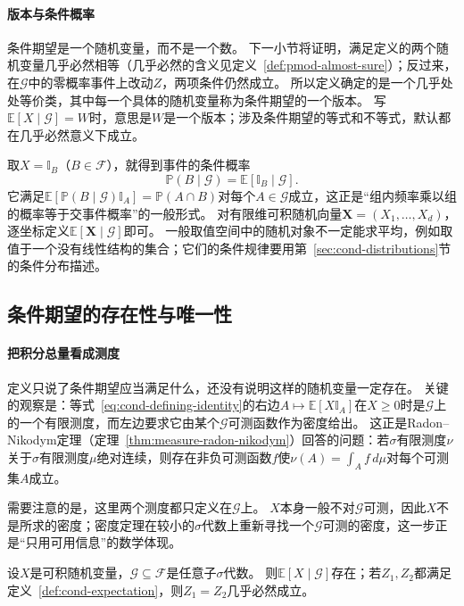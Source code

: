 \paragraph{版本与条件概率}
条件期望是一个随机变量，而不是一个数。
下一小节将证明，满足定义的两个随机变量几乎必然相等（几乎必然的含义见定义~\ref{def:pmod-almost-sure}）；反过来，在$\mathcal G$中的零概率事件上改动$Z$，两项条件仍然成立。
所以定义确定的是一个几乎处处等价类，其中每一个具体的随机变量称为条件期望的一个版本。
写$\mathbb E[X\mid\mathcal G]=W$时，意思是$W$是一个版本；涉及条件期望的等式和不等式，默认都在几乎必然意义下成立。

取$X=\mathbb I_B$（$B\in\mathcal F$），就得到事件的条件概率
\[
  \mathbb P(B\mid\mathcal G)=\mathbb E[\mathbb I_B\mid\mathcal G].
\]
它满足$\mathbb E[\mathbb P(B\mid\mathcal G)\mathbb I_A]=\mathbb P(A\cap B)$对每个$A\in\mathcal G$成立，这正是“组内频率乘以组的概率等于交事件概率”的一般形式。
对有限维可积随机向量$\bm X=(X_1,\ldots,X_d)$，逐坐标定义$\mathbb E[\bm X\mid\mathcal G]$即可。
一般取值空间中的随机对象不一定能求平均，例如取值于一个没有线性结构的集合；它们的条件规律要用第~\ref{sec:cond-distributions}节的条件分布描述。

\subsection{条件期望的存在性与唯一性}

\paragraph{把积分总量看成测度}
定义只说了条件期望应当满足什么，还没有说明这样的随机变量一定存在。
关键的观察是：等式~\eqref{eq:cond-defining-identity}的右边$A\mapsto\mathbb E[X\mathbb I_A]$在$X\geq0$时是$\mathcal G$上的一个有限测度，而左边要求它由某个$\mathcal G$可测函数作为密度给出。
这正是Radon--Nikodym定理（定理~\ref{thm:measure-radon-nikodym}）回答的问题：若$\sigma$有限测度$\nu$关于$\sigma$有限测度$\mu$绝对连续，则存在非负可测函数$f$使$\nu(A)=\int_Af\,d\mu$对每个可测集$A$成立。

需要注意的是，这里两个测度都只定义在$\mathcal G$上。
$X$本身一般不对$\mathcal G$可测，因此$X$不是所求的密度；密度定理在较小的$\sigma$代数上重新寻找一个$\mathcal G$可测的密度，这一步正是“只用可用信息”的数学体现。

\begin{theorem}[条件期望的存在性与唯一性]
\label{thm:cond-existence}
设$X$是可积随机变量，$\mathcal G\subseteq\mathcal F$是任意子$\sigma$代数。
则$\mathbb E[X\mid\mathcal G]$存在；若$Z_1,Z_2$都满足定义~\ref{def:cond-expectation}，则$Z_1=Z_2$几乎必然成立。
\end{theorem}

